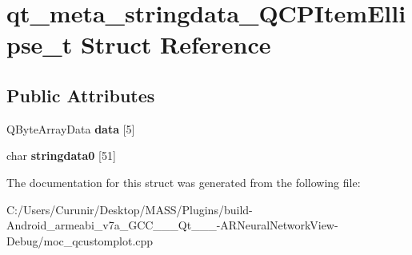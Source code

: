 \hypertarget{structqt__meta__stringdata___q_c_p_item_ellipse__t}{}\section{qt\+\_\+meta\+\_\+stringdata\+\_\+\+Q\+C\+P\+Item\+Ellipse\+\_\+t Struct Reference}
\label{structqt__meta__stringdata___q_c_p_item_ellipse__t}
\subsection*{Public Attributes}
\begin{DoxyCompactItemize}
\item 
\mbox{\label{structqt__meta__stringdata___q_c_p_item_ellipse__t_a80e845186c8b4e3e328a94748c30c058}} 
Q\+Byte\+Array\+Data {\bfseries data} \mbox{[}5\mbox{]}
\item 
\mbox{\label{structqt__meta__stringdata___q_c_p_item_ellipse__t_af011d635922a65a6612f41700bc152b9}} 
char {\bfseries stringdata0} \mbox{[}51\mbox{]}
\end{DoxyCompactItemize}


The documentation for this struct was generated from the following file\+:\begin{DoxyCompactItemize}
\item 
C\+:/\+Users/\+Curunir/\+Desktop/\+M\+A\+S\+S/\+Plugins/build-\/\+Android\+\_\+armeabi\+\_\+v7a\+\_\+\+G\+C\+C\+\_\+\_\+\_\+\+Qt\+\_\+\_\+\_-\/\+A\+R\+Neural\+Network\+View-\/\+Debug/moc\+\_\+qcustomplot.\+cpp\end{DoxyCompactItemize}
